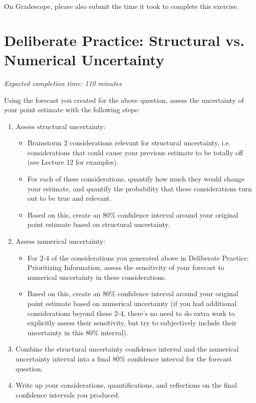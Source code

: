 \documentclass[11pt]{article}
\begin{document}
On Gradescope, please also submit the time it took to complete this exercise.

\section*{Deliberate Practice: Structural vs. Numerical Uncertainty}


\emph{Expected completion time: 110 minutes}

Using the forecast you created for the above question, assess the uncertainty of your point estimate with the following steps:
\begin{enumerate}
	\item Assess structural uncertainty:
	\begin{itemize}
		\item Brainstorm 2 considerations relevant for structural uncertainty, i.e. considerations that could cause your previous estimate to be totally off (see Lecture 12 for examples).
		\item For each of these considerations, quantify how much they would change your estimate, and quantify the probability that these considerations turn out to be true and relevant.
		\item Based on this, create an 80\% confidence interval around your original point estimate based on structural uncertainty.
	\end{itemize}
	
	\item Assess numerical uncertainty:
	\begin{itemize}
		\item For 2-4 of the considerations you generated above in Deliberate Practice: Prioritizing Information, assess the sensitivity of your forecast to numerical uncertainty in these considerations.
		\item Based on this, create an 80\% confidence interval around your original point estimate based on numerical uncertainty (if you had additional considerations beyond these 2-4, there's no need to do extra work to explicitly assess their sensitivity, but try to subjectively include their uncertainty in this 80\% interval).   
	\end{itemize}
	
	\item Combine the structural uncertainty confidence interval and the numerical uncertainty interval into a final 80\% confidence interval for the forecast question.
	\item Write up your considerations, quantifications, and reflections on the final confidence intervals you produced.
	\end{enumerate}
\end{document}
